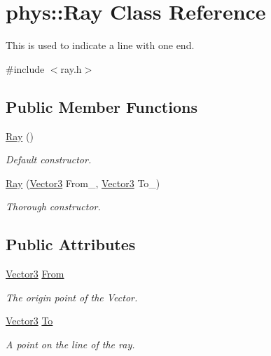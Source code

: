 \hypertarget{classphys_1_1Ray}{
\section{phys::Ray Class Reference}
\label{df/d57/classphys_1_1Ray}
}


This is used to indicate a line with one end.  




{\ttfamily \#include $<$ray.h$>$}

\subsection*{Public Member Functions}
\begin{DoxyCompactItemize}
\item 
\hyperlink{classphys_1_1Ray_a35f4f5eec653ea561353163eaad672d3}{Ray} ()
\begin{DoxyCompactList}\small\item\em Default constructor. \item\end{DoxyCompactList}\item 
\hyperlink{classphys_1_1Ray_aa6123ef37a2351e6cca3954c23212379}{Ray} (\hyperlink{classphys_1_1Vector3}{Vector3} From\_\-, \hyperlink{classphys_1_1Vector3}{Vector3} To\_\-)
\begin{DoxyCompactList}\small\item\em Thorough constructor. \item\end{DoxyCompactList}\end{DoxyCompactItemize}
\subsection*{Public Attributes}
\begin{DoxyCompactItemize}
\item 
\hypertarget{classphys_1_1Ray_a3004d52f8f1e317ee602f8f278531057}{
\hyperlink{classphys_1_1Vector3}{Vector3} \hyperlink{classphys_1_1Ray_a3004d52f8f1e317ee602f8f278531057}{From}}
\label{df/d57/classphys_1_1Ray_a3004d52f8f1e317ee602f8f278531057}

\begin{DoxyCompactList}\small\item\em The origin point of the Vector. \item\end{DoxyCompactList}\item 
\hypertarget{classphys_1_1Ray_aa2585a1c6d29d1533c816e7277baf1ad}{
\hyperlink{classphys_1_1Vector3}{Vector3} \hyperlink{classphys_1_1Ray_aa2585a1c6d29d1533c816e7277baf1ad}{To}}
\label{df/d57/classphys_1_1Ray_aa2585a1c6d29d1533c816e7277baf1ad}

\begin{DoxyCompactList}\small\item\em A point on the line of the ray. \item\end{DoxyCompactList}\end{DoxyCompactItemize}


